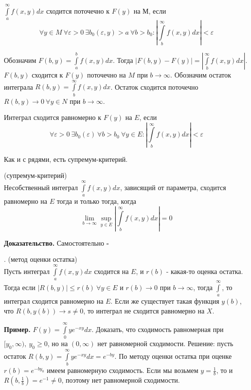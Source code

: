 \begin{defin}
$\int\limits_{a}^{\infty}f(x,y)dx$ сходится поточечно к $F(y)$ на М, если
$$\forall y\in M~\forall \varepsilon>0~\exists b_0(\varepsilon,y)>a~
\forall b>b_0:\left| \int\limits_{b}^{\infty}f(x,y)dx\right|<\varepsilon$$
\end{defin}
Обозначим $F(b,y)=\int\limits_{a}^{b}f(x,y)dx$. Тогда $|F(b,y)-F(y)|=
\left| \int\limits_{b}^{\infty} f(x,y)dx \right|$. $F(b,y)$ сходится к $F(y)$
поточечно на  $M$ при  $b\to \infty$. Обозначим остаток интеграла
$R(b,y)=\int\limits_{b}^{\infty}f(x,y)dx$. Остаток сходится поточечно 
$R(b,y)\to 0~\forall y\in N$ при $b\to \infty$. 
\begin{defin}
Интеграл сходится равномерно к $F(y)$ на  $E$, если
$$\forall \varepsilon>0~\exists b_0(\varepsilon)~\forall b>b_0~\forall y\in E:
\left| \int\limits_{b}^{\infty}f(x,y)dx\right|<\varepsilon$$
\end{defin}
Как и с рядями, есть супремум-критерий.
\begin{theor}
    (супремум-критерий)\\
    Несобственный интеграл $\int\limits_{a}^{\infty} f(x,y)dx$, зависящий от
    параметра, сходится равномерно на $E$ тогда и только тогда, когда
    $$\lim\limits_{b\to \infty}\sup\limits_{y\in  E}\left| 
    \int\limits_{b}^{\infty}f(x,y)dx \right|=0$$
\end{theor}
\textbf{Доказательство.}  Самостоятельно
$\square$ \\
\begin{theor}.
    (метод оценки остатка)\\
Пусть интеграл $\int\limits_{a}^{\infty} f(x,y)dx$ сходится на $E$, и 
$r(b)$ - какая-то оценка остатка. Тогда если
 $|R(b,y)|\leqslant r(b)~\forall y\in E$ и $r(b)\to 0$ при  $b\to \infty$,
 тогда $\int\limits_{a}^{\infty}$, то интеграл сходится равномерно на 
 $E$. Если же существует такая функция  $y(b)$, что $R(b,y(b))\to s\ne 0$,
 то интеграл не сходится равномерно на $X$.
\end{theor}

\textbf{Пример.} $F(y)=\int\limits_{0}^{\infty}ye^{-xy}dx$. Доказать, что 
сходимость равномерная при $[y_0,\infty),~y_0\geqslant0$, но на 
$(0,\infty)$ нет равномерной сходимости. Решение: пусть остаток
$R(b,y)=\int\limits_{b}^{\infty}ye^{-xy}dx=e^{-by}$. По методу оценки
остатка при оценке $r(b)=e^{-by_0}$ имеем равномерную сходимость.
Если мы возьмем $y=\frac{1}{b}$, то и $R(b,\frac{1}{b})=e^{-1}\ne0$, поэтому
нет равномерной сходимости. 



